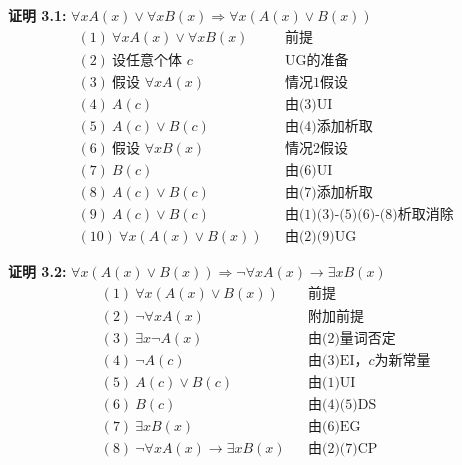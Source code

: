 \noindent
\textbf{证明 3.1:} $\forall xA(x)\lor \forall xB(x)\Rightarrow \forall x(A(x)\lor B(x))$
\vspace{-10pt}
\begin{align*}
&(1)\ \forall xA(x) \lor \forall xB(x) && \text{前提} \\
&(2)\ \text{设任意个体 $c$} && \text{UG的准备} \\
&(3)\ \text{假设 } \forall xA(x) && \text{情况1假设} \\
&(4)\ A(c) && \text{由(3)UI} \\
&(5)\ A(c) \lor B(c) && \text{由(4)添加析取} \\
&(6)\ \text{假设 } \forall xB(x) && \text{情况2假设} \\
&(7)\ B(c) && \text{由(6)UI} \\
&(8)\ A(c) \lor B(c) && \text{由(7)添加析取} \\
&(9)\ A(c) \lor B(c) && \text{由(1)(3)-(5)(6)-(8)析取消除} \\
&(10)\ \forall x(A(x)\lor B(x)) && \text{由(2)(9)UG}
\end{align*}

\noindent
\textbf{证明 3.2:} $\forall x(A(x)\lor B(x))\Rightarrow \neg\forall xA(x)\to\exists xB(x)$
\vspace{-10pt}
\begin{align*}
&(1)\ \forall x(A(x)\lor B(x)) && \text{前提} \\
&(2)\ \neg\forall xA(x) && \text{附加前提} \\
&(3)\ \exists x\neg A(x) && \text{由(2)量词否定} \\
&(4)\ \neg A(c) && \text{由(3)EI，$c$为新常量} \\
&(5)\ A(c) \lor B(c) && \text{由(1)UI} \\
&(6)\ B(c) && \text{由(4)(5)DS} \\
&(7)\ \exists xB(x) && \text{由(6)EG} \\
&(8)\ \neg\forall xA(x) \to \exists xB(x) && \text{由(2)(7)CP}
\end{align*}

